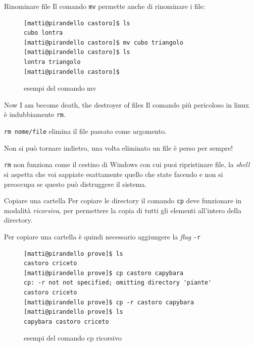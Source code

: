 \documentclass{beamer}
\begin{document}
\begin{frame}[fragile]{Rinominare file}
  Il comando \texttt{mv} permette anche di rinominare i file:
  \begin{figure}
    \begin{lstlisting}[basicstyle=\normalsize]
[matti@pirandello castoro]$ ls
cubo lontra
[matti@pirandello castoro]$ mv cubo triangolo
[matti@pirandello castoro]$ ls
lontra triangolo
[matti@pirandello castoro]$
    \end{lstlisting}
    \caption{esempi del comando mv}
  \end{figure}
\end{frame}

\begin{frame}{Now I am become death, the destroyer of files}
  Il comando più pericoloso in linux è indubbiamente \texttt{rm}.\bigskip

  \texttt{rm nome/file} elimina il file passato come argomento.\bigskip

  Non si può tornare indietro, una volta eliminato un file è perso per 
  sempre!\bigskip

  \texttt{rm} non funziona come il cestino di Windows con cui puoi ripristinare file,
  la \textit{shell} si aspetta che voi sappiate esattamente quello che state 
  facendo e non si preoccupa se questo può distruggere il sistema.
\end{frame}

\begin{frame}[fragile]{Copiare una cartella}
  Per copiare le directory il comando \texttt{cp} deve funzionare in modalità 
  \textit{ricorsiva}, per permettere la copia di tutti gli elementi all'intero
  della directory.\bigskip

  Per copiare una cartella è quindi necessario aggiungere la \textit{flag} 
  \texttt{-r}
  \begin{figure}
    \begin{lstlisting}[basicstyle=\footnotesize]
[matti@pirandello prove]$ ls 
castoro criceto
[matti@pirandello prove]$ cp castoro capybara 
cp: -r not not specified; omitting directory 'piante'
castoro criceto
[matti@pirandello prove]$ cp -r castoro capybara 
[matti@pirandello prove]$ ls 
capybara castoro criceto
    \end{lstlisting}
    \caption{esempi del comando cp ricorsivo}
  \end{figure}
\end{frame}
\end{document}
